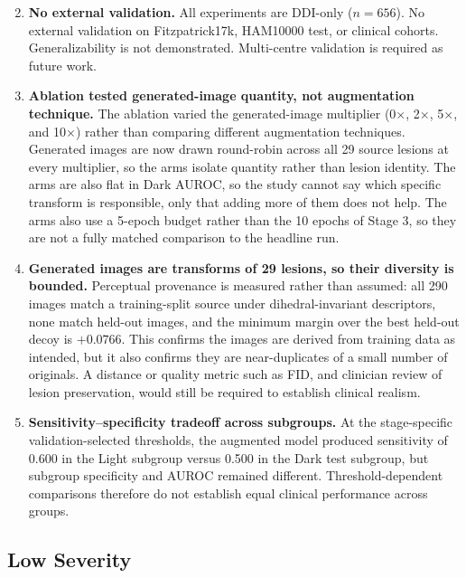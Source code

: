 \begin{enumerate}
    \setcounter{enumi}{1}
    \item \textbf{No external validation.} All experiments are DDI-only ($n=656$). No external validation on Fitzpatrick17k, HAM10000 test, or clinical cohorts. Generalizability is not demonstrated. Multi-centre validation is required as future work.

    \item \textbf{Ablation tested generated-image quantity, not augmentation technique.} The ablation varied the generated-image multiplier (0$\times$, 2$\times$, 5$\times$, and 10$\times$) rather than comparing different augmentation techniques. Generated images are now drawn round-robin across all 29 source lesions at every multiplier, so the arms isolate quantity rather than lesion identity. The arms are also flat in Dark AUROC, so the study cannot say which specific transform is responsible, only that adding more of them does not help. The arms also use a 5-epoch budget rather than the 10 epochs of Stage 3, so they are not a fully matched comparison to the headline run.

    \item \textbf{Generated images are transforms of 29 lesions, so their diversity is bounded.} Perceptual provenance is measured rather than assumed: all 290 images match a training-split source under dihedral-invariant descriptors, none match held-out images, and the minimum margin over the best held-out decoy is $+0.0766$. This confirms the images are derived from training data as intended, but it also confirms they are near-duplicates of a small number of originals. A distance or quality metric such as FID, and clinician review of lesion preservation, would still be required to establish clinical realism.

    \item \textbf{Sensitivity--specificity tradeoff across subgroups.} At the stage-specific validation-selected thresholds, the augmented model produced sensitivity of 0.600 in the Light subgroup versus 0.500 in the Dark test subgroup, but subgroup specificity and AUROC remained different. Threshold-dependent comparisons therefore do not establish equal clinical performance across groups.
\end{enumerate}

\subsection{Low Severity}


